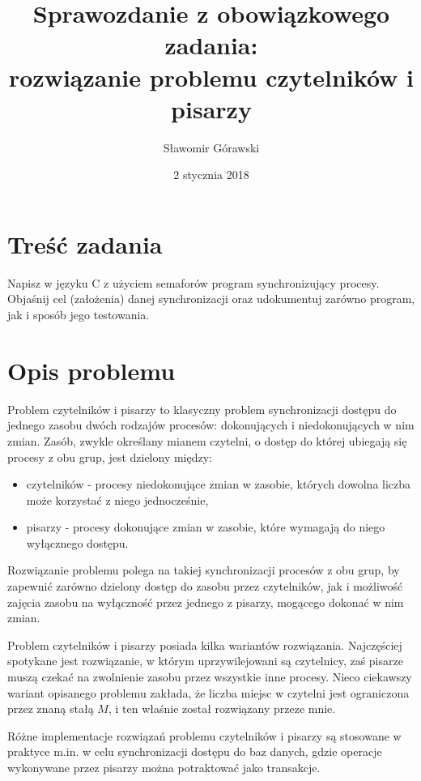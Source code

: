 \documentclass{article}
\title{Sprawozdanie z obowiązkowego zadania: \\ rozwiązanie problemu czytelników i pisarzy}
\author{Sławomir Górawski}
\date{2 stycznia 2018}
\begin{document}
\maketitle

\section{Treść zadania}

Napisz w języku C z użyciem semaforów program synchronizujący procesy.
Objaśnij cel (założenia) danej synchronizacji oraz udokumentuj zarówno
program, jak i sposób jego testowania.

\section{Opis problemu}

Problem czytelników i pisarzy to klasyczny problem synchronizacji dostępu do jednego zasobu dwóch rodzajów procesów: dokonujących i niedokonujących w nim zmian. Zasób, zwykle określany mianem czytelni, o dostęp do której ubiegają się procesy z obu grup, jest dzielony między:

\begin{itemize}
    \item czytelników - procesy niedokonujące zmian w zasobie, których dowolna liczba może korzystać z niego jednocześnie,
    \item pisarzy - procesy dokonujące zmian w zasobie, które wymagają do niego wyłącznego dostępu.
\end{itemize}

Rozwiązanie problemu polega na takiej synchronizacji procesów z obu grup, by zapewnić zarówno dzielony dostęp do zasobu przez czytelników, jak i możliwość zajęcia zasobu na wyłączność przez jednego z pisarzy, mogącego dokonać w nim zmian. 

Problem czytelników i pisarzy posiada kilka wariantów rozwiązania. Najczęściej spotykane jest rozwiązanie, w którym uprzywilejowani są czytelnicy, zaś pisarze muszą czekać na zwolnienie zasobu przez wszystkie inne procesy. Nieco ciekawszy wariant opisanego problemu zakłada, że liczba miejsc w czytelni jest ograniczona przez znaną stałą $M$, i ten właśnie został rozwiązany przeze mnie.

Różne implementacje rozwiązań problemu czytelników i pisarzy są stosowane w praktyce m.in. w celu synchronizacji dostępu do baz danych, gdzie operacje wykonywane przez pisarzy można potraktować jako transakcje.
\end{document}
